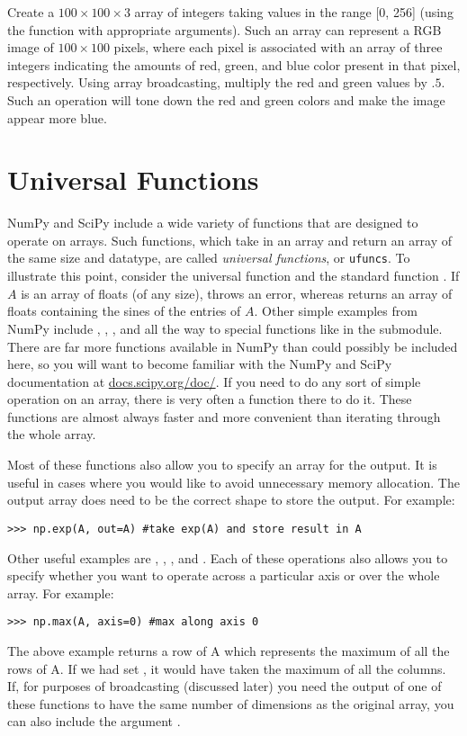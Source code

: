 \begin{problem}
Create a $100\times100\times3$ array of integers taking values in the range [0, 256] 
(using the function  with appropriate arguments).
Such an array can represent a RGB image of $100\times100$ pixels, where each pixel 
is associated with an array of three integers indicating the amounts of red, green, and blue color present in that pixel, respectively. 
Using array broadcasting, multiply the red and green values by $.5$. Such an operation will tone down the red and green colors 
and make the image appear more blue. 
\end{problem}

\section*{Universal Functions}
NumPy and SciPy include a wide variety of functions that are designed to operate on 
arrays.
Such functions, which take in an array and return an array of the same size and
datatype, are called \emph{universal functions}, or \texttt{ufuncs}. To illustrate this point, consider 
the universal function  and the standard function . If $A$ 
is an array of floats (of any size),  throws an error, whereas 
 returns an array of floats containing the sines of the entries of $A$. 
Other simple examples from NumPy include , , , and 
 all the way to special functions like  in the  submodule.
There are far more functions available in NumPy than could possibly be included here, so you will want to become familiar with the NumPy and SciPy documentation at \url{docs.scipy.org/doc/}.
If you need to do any sort of simple operation on an array, there is very often a function there to do it.
These functions are almost always faster and more convenient than iterating through the whole array.

Most of these functions also allow you to specify an array for the output.
It is useful in cases where you would like to avoid unnecessary memory allocation.
The output array does need to be the correct shape to store the output.
For example:
\begin{lstlisting}
>>> np.exp(A, out=A) #take exp(A) and store result in A
\end{lstlisting}

Other useful examples are , , , and .
Each of these operations also allows you to specify whether you want to operate across a particular axis or over the whole array.
For example:
\begin{lstlisting}
>>> np.max(A, axis=0) #max along axis 0
\end{lstlisting}
The above example returns a row of A which represents the maximum of all the rows of A.
If we had set , it would have taken the maximum of all the columns.
If, for purposes of broadcasting (discussed later) you need the output of one of these functions to have the same number of dimensions as the original array, you can also include the argument .


